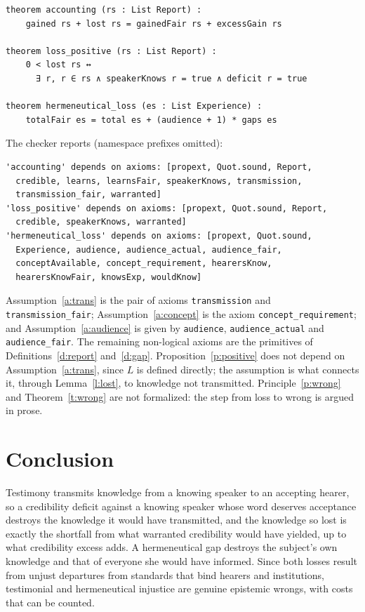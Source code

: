 \documentclass{situationist-preprint}
\begin{document}
\begin{lstlisting}
theorem accounting (rs : List Report) :
    gained rs + lost rs = gainedFair rs + excessGain rs

theorem loss_positive (rs : List Report) :
    0 < lost rs ↔
      ∃ r, r ∈ rs ∧ speakerKnows r = true ∧ deficit r = true

theorem hermeneutical_loss (es : List Experience) :
    totalFair es = total es + (audience + 1) * gaps es
\end{lstlisting}

The checker reports (namespace prefixes omitted):

\begin{lstlisting}
'accounting' depends on axioms: [propext, Quot.sound, Report,
  credible, learns, learnsFair, speakerKnows, transmission,
  transmission_fair, warranted]
'loss_positive' depends on axioms: [propext, Quot.sound, Report,
  credible, speakerKnows, warranted]
'hermeneutical_loss' depends on axioms: [propext, Quot.sound,
  Experience, audience, audience_actual, audience_fair,
  conceptAvailable, concept_requirement, hearersKnow,
  hearersKnowFair, knowsExp, wouldKnow]
\end{lstlisting}

Assumption~\ref{a:trans} is the pair of axioms \texttt{transmission} and \texttt{transmission\_fair}; Assumption~\ref{a:concept} is the axiom \texttt{concept\_requirement}; and Assumption~\ref{a:audience} is given by \texttt{audience}, \texttt{audience\_actual} and \texttt{audience\_fair}. The remaining non-logical axioms are the primitives of Definitions~\ref{d:report} and~\ref{d:gap}. Proposition~\ref{p:positive} does not depend on Assumption~\ref{a:trans}, since $L$ is defined directly; the assumption is what connects it, through Lemma~\ref{l:lost}, to knowledge not transmitted. Principle~\ref{p:wrong} and Theorem~\ref{t:wrong} are not formalized: the step from loss to wrong is argued in prose.

\section{Conclusion}

Testimony transmits knowledge from a knowing speaker to an accepting hearer, so a credibility deficit against a knowing speaker whose word deserves acceptance destroys the knowledge it would have transmitted, and the knowledge so lost is exactly the shortfall from what warranted credibility would have yielded, up to what credibility excess adds. A hermeneutical gap destroys the subject's own knowledge and that of everyone she would have informed. Since both losses result from unjust departures from standards that bind hearers and institutions, testimonial and hermeneutical injustice are genuine epistemic wrongs, with costs that can be counted.
\end{document}
